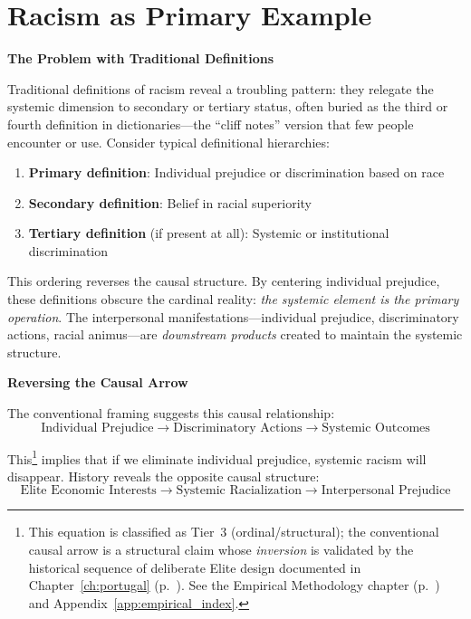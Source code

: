 \section{Racism as Primary Example}

\textbf{The Problem with Traditional Definitions}

Traditional definitions of racism reveal a troubling pattern: they relegate the systemic dimension to secondary or tertiary status, often buried as the third or fourth definition in dictionaries---the ``cliff notes'' version that few people encounter or use. Consider typical definitional hierarchies:

\begin{enumerate}
    \item \textbf{Primary definition}: Individual prejudice or discrimination based on race
    \item \textbf{Secondary definition}: Belief in racial superiority
    \item \textbf{Tertiary definition} (if present at all): Systemic or institutional discrimination
\end{enumerate}

This ordering reverses the causal structure. By centering individual prejudice, these definitions obscure the cardinal reality: \textit{the systemic element is the primary operation}. The interpersonal manifestations---individual prejudice, discriminatory actions, racial animus---are \textit{downstream products} created to maintain the systemic structure.

\textbf{Reversing the Causal Arrow}

The conventional framing suggests this causal relationship:
\begin{equation}\label{eq:1.3-conventional-causal-arrow}
\text{Individual Prejudice} \rightarrow \text{Discriminatory Actions} \rightarrow \text{Systemic Outcomes}
\end{equation}

This\footnote{This equation is classified as Tier~3 (ordinal/structural); the conventional causal arrow is a structural claim whose \textit{inversion} is validated by the historical sequence of deliberate Elite design documented in Chapter~\ref{ch:portugal} (p.~\pageref{ch:portugal}). See the Empirical Methodology chapter (p.~\pageref{ch:empirical_methodology}) and Appendix~\ref{app:empirical_index}.} implies that if we eliminate individual prejudice, systemic racism will disappear. History reveals the opposite causal structure:
\begin{equation}\label{eq:1.4-elite-causal-arrow}
\text{Elite Economic Interests} \rightarrow \text{Systemic Racialization} \rightarrow \text{Interpersonal Prejudice}
\end{equation}

